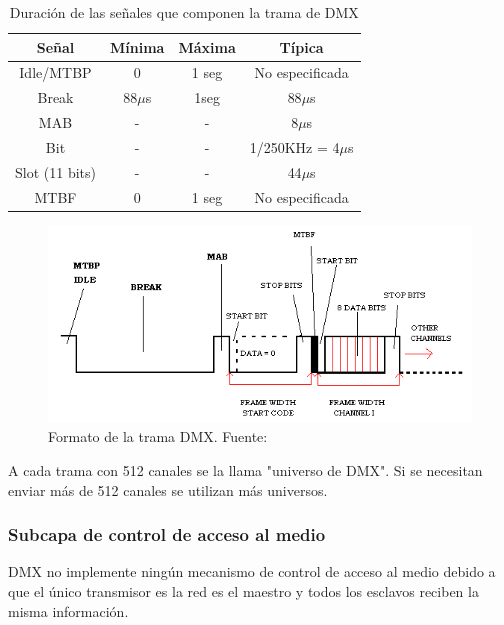 \begin{table}[!ht]
	\begin{center}
		\begin{tabular}{|c|c|c|c|}
			\hline
			\rowcolor{OODlightblue}
			\textbf{Señal} & \textbf{Mínima} & \textbf{Máxima} & \textbf{Típica} \\
			\hline \hline
			Idle/MTBP & 0 & 1 seg & No especificada \\
			Break & 88\(\mu \)s & 1seg & 88\(\mu \)s\\
			MAB & - & - & 8\(\mu \)s \\
			Bit & - & - & 1/250KHz = 4\(\mu \)s \\
			Slot (11 bits) & - & - & 44\(\mu \)s \\
			MTBF & 0 & 1 seg & No especificada \\
			\hline
		\end{tabular}
	\end{center}
	\caption{Duración de las señales que componen la trama de DMX}
	\label{table:\thetable}
\end{table}

\begin{figure}[!ht]
	\centering
	\includegraphics[width=15cm,scale=1]{resources/1_8-tramaDMX.png}
	\caption{Formato de la trama DMX. Fuente: \cite{fig1_8}}
	\label{fig:\thefigure}
\end{figure}

A cada trama con 512 canales se la llama "universo de DMX". Si se necesitan enviar más de 512 canales se utilizan más universos.

\subsubsection{Subcapa de control de acceso al medio}
DMX no implemente ningún mecanismo de control de acceso al medio debido a que el único transmisor es la red es el maestro y todos los esclavos reciben la misma información.

